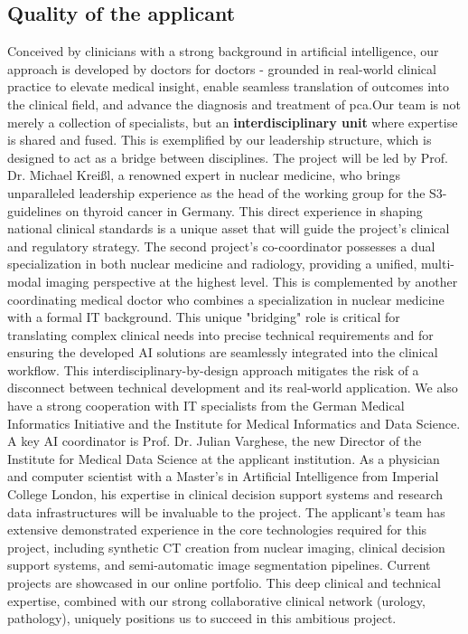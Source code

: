 \documentclass[11pt, a4paper]{article}
\begin{document}
\subsection{Quality of the applicant}
Conceived by clinicians with a strong background in artificial intelligence, our approach is developed by doctors for doctors - grounded in real-world clinical practice to elevate medical insight, enable seamless translation of outcomes into the clinical field, and advance the diagnosis and treatment of \gls{pca}.Our team is not merely a collection of specialists, but an \textbf{interdisciplinary unit} where expertise is shared and fused. This is exemplified by our leadership structure, which is designed to act as a bridge between disciplines. The project will be led by Prof. Dr. Michael Kreißl, a renowned expert in nuclear medicine, who brings unparalleled leadership experience as the head of the working group for the S3-guidelines on thyroid cancer in Germany. This direct experience in shaping national clinical standards is a unique asset that will guide the project's clinical and regulatory strategy. The second project's co-coordinator possesses a dual specialization in both nuclear medicine and radiology, providing a unified, multi-modal imaging perspective at the highest level. This is complemented by another coordinating medical doctor who combines a specialization in nuclear medicine with a formal IT background. This unique "bridging" role is critical for translating complex clinical needs into precise technical requirements and for ensuring the developed AI solutions are seamlessly integrated into the clinical workflow. This interdisciplinary-by-design approach mitigates the risk of a disconnect between technical development and its real-world application. We also have a strong cooperation with IT specialists from the German Medical Informatics Initiative and the Institute for Medical Informatics and Data Science. A key AI coordinator is Prof. Dr. Julian Varghese, the new Director of the Institute for Medical Data Science at the applicant institution. As a physician and computer scientist with a Master's in Artificial Intelligence from Imperial College London, his expertise in clinical decision support systems and research data infrastructures will be invaluable to the project.
The applicant's team has extensive demonstrated experience in the core technologies required for this project, including synthetic CT creation from nuclear imaging, clinical decision support systems, and semi-automatic image segmentation pipelines. Current projects are showcased in our online portfolio. This deep clinical and technical expertise, combined with our strong collaborative  clinical network (urology, pathology), uniquely positions us to succeed in this ambitious project.
\end{document}
